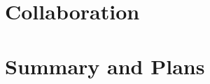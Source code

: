 \documentclass{dune}
\begin{document}

\cleardoublepage


\cleardoublepage


\cleardoublepage


\cleardoublepage

\part{Collaboration}


\cleardoublepage


\cleardoublepage


\cleardoublepage


\cleardoublepage


\part{Summary and Plans}




\end{document}
